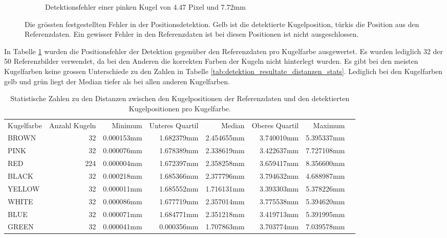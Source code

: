 \begin{figure}[h!]
\begin{subfigure}[t]{0.3\textwidth}
        \caption{Detektionsfehler einer pinken Kugel von 4.47 Pixel und 7.72mm}
        \label{fig:detection_results_bad_detection_2}
    \end{subfigure}
    \caption{
        Die grössten festgestellten Fehler in der Positionsdetektion. Gelb ist die detektierte Kugelposition, türkis die Position aus den Referenzdaten.
        Ein gewisser Fehler in den Referenzdaten ist bei diesen Positionen ist nicht ausgeschlossen.
    }
    \label{fig:detection_results_bad_detections}
\end{figure}

In Tabelle \ref{tab:detektion_resultate_distanzen_stats_pro_kugelfarbe} wurden die Positionsfehler der Detektion
gegenüber den Referenzdaten pro Kugelfarbe ausgewertet.
Es wurden lediglich 32 der 50 Referenzbilder verwendet, da bei den Anderen die korrekten Farben der Kugeln nicht hinterlegt wurden.
Es gibt bei den meisten Kugelfarben keine grossen Unterschiede zu den Zahlen in Tabelle \ref{tab:detektion_resultate_distanzen_stats}.
Lediglich bei den Kugelfarben gelb und grün liegt der Median tiefer als bei allen anderen Kugelfarben.

\begin{table}[ht]
    \begin{tabular}{ lrrrrrrr }
        \rowcolor{\seccolor!50}
        Kugelfarbe & Anzahl Kugeln & Minimum & Unteres Quartil & Median & Oberes Quartil & Maximum\\
        BROWN & 32 & 0.000153mm & 1.682379mm & 2.454655mm & 3.740010mm & 5.395337mm \\
        PINK & 32 & 0.000076mm & 1.678389mm & 2.338619mm & 3.422637mm & 7.727108mm \\
        RED & 224 & 0.000004mm & 1.672397mm & 2.358258mm & 3.659417mm & 8.356600mm \\
        BLACK & 32 & 0.000218mm & 1.685366mm & 2.377796mm & 3.794632mm & 4.688987mm \\
        YELLOW & 32 & 0.000011mm & 1.685552mm & 1.716131mm & 3.393303mm & 5.378226mm \\
        WHITE & 32 & 0.000086mm & 1.677719mm & 2.357014mm & 3.775538mm & 5.394620mm \\
        BLUE & 32 & 0.000071mm & 1.684771mm & 2.351218mm & 3.419713mm & 5.391995mm \\
        GREEN & 32 & 0.000041mm & 0.000356mm & 1.707863mm & 3.703774mm & 7.039578mm
    \end{tabular}
    \caption{Statistische Zahlen zu den Distanzen zwischen den Kugelpositionen der Referenzdaten und den detektierten Kugelpositionen pro Kugelfarbe.}
    \label{tab:detektion_resultate_distanzen_stats_pro_kugelfarbe}
\end{table}

